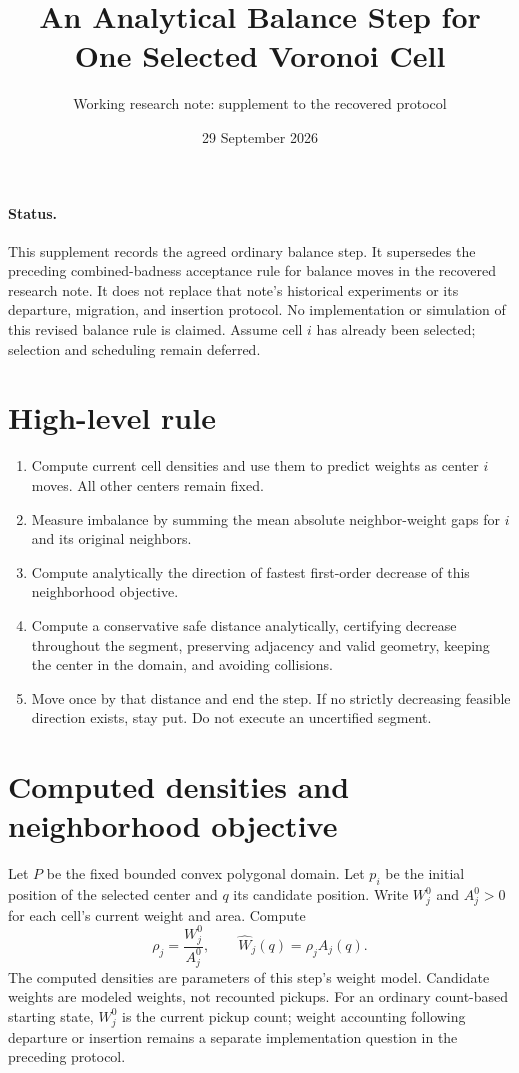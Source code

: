 \documentclass[11pt]{article}
\title{An Analytical Balance Step for One Selected Voronoi Cell}
\author{Working research note: supplement to the recovered protocol}
\date{29 September 2026}
\begin{document}
\maketitle

\paragraph{Status.}
This supplement records the agreed ordinary balance step. It supersedes
the preceding combined-badness acceptance rule for balance moves in the
recovered research note. It does not replace that note's historical
experiments or its departure, migration, and insertion protocol.
No implementation or simulation of this revised balance rule is claimed.
Assume cell $i$ has already been selected; selection and scheduling remain
deferred.

\section{High-level rule}
\begin{enumerate}
\item Compute current cell densities and use them to predict weights as
center $i$ moves. All other centers remain fixed.
\item Measure imbalance by summing the mean absolute neighbor-weight gaps
for $i$ and its original neighbors.
\item Compute analytically the direction of fastest first-order decrease
of this neighborhood objective.
\item Compute a conservative safe distance analytically, certifying decrease
throughout the segment, preserving adjacency and valid geometry, keeping
the center in the domain, and avoiding collisions.
\item Move once by that distance and end the step. If no strictly decreasing
feasible direction exists, stay put. Do not execute an uncertified segment.
\end{enumerate}

\section{Computed densities and neighborhood objective}
Let $P$ be the fixed bounded convex polygonal domain. Let $p_i$ be the
initial position of the selected center and $q$ its candidate position.
Write $W_j^0$ and $A_j^0>0$ for each cell's current weight and area.
Compute
\[
 \rho_j=\frac{W_j^0}{A_j^0},\qquad
 \widehat W_j(q)=\rho_j A_j(q).
\]
The computed densities are parameters of this step's weight model.
Candidate weights are modeled weights, not recounted pickups. For an
ordinary count-based starting state, $W_j^0$ is the current pickup count;
weight accounting following departure or insertion remains a separate
implementation question in the preceding protocol.
\end{document}
